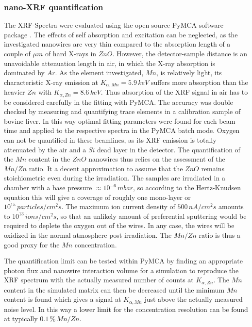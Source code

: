 \subsubsection{nano-XRF quantification}

The XRF-Spectra were evaluated using the open source PyMCA software package \cite{sole_multiplatform_2007}. The effects of self absorption and excitation can be neglected, as the investigated nanowires are very thin compared to the absorption length of a couple of $\mu m$ of hard X-rays in $ZnO$. However, the detector-sample distance is an unavoidable attenuation length in air, in which the X-ray absorption is dominated by $Ar$. As the element investigated, $Mn$, is relatively light, its characteristic X-ray emission at $K_{\alpha,Mn} = 5.9\,keV$ suffers more absorption than the heavier $Zn$ with $K_{\alpha,Zn} = 8.6\,keV$. Thus absorption of the XRF signal in air has to be considered carefully in the fitting with PyMCA. The accuracy was double checked by measuring and quantifying trace elements in a calibration sample of bovine liver. In this way optimal fitting parameters were found for each beam-time and applied to the respective spectra in the PyMCA batch mode.  Oxygen can not be quantified in these beamlines, as its XRF emission is totally attenuated by the air and a $Si$ dead layer in the detector. The quantification of the $Mn$ content in the $ZnO$ nanowires thus relies on the assessment of the $Mn/Zn$ ratio. It a decent approximation to assume that the $ZnO$ remains stoichiometric even during the irradiation. The samples are irradiated in a chamber with a base pressure $\approx 10^{-6}\,mbar$, so according to the Hertz-Knudsen equation this will give a coverage of roughly one mono-layer or $10^{15}\,particles/cm^2s$. The maximum ion current density of $500\,nA/cm^2s$ amounts to $10^{13}\,ions/cm^2s$, so that an unlikely amount of preferential sputtering would be required to deplete the oxygen out of the wires. In any case, the wires will be oxidized in the normal atmosphere post irradiation. The $Mn/Zn$ ratio is thus a good proxy for the $Mn$ concentration.

The quantification limit can be tested within PyMCA by finding an appropriate photon flux and nanowire interaction volume for a simulation to reproduce the XRF spectrum with the actually measured number of counts at $K_{\alpha,Zn}$. The $Mn$ content in the simulated matrix can then be decreased until the minimum $Mn$ content is found which gives a signal at $K_{\alpha,Mn}$ just above the actually measured noise level. In this way a lower limit for the concentration resolution can be found at typically $0.1\,\%\,Mn/Zn$.




